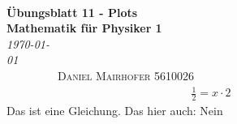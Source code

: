 \documentclass[10pt]{article}
\begin{document}
{\noindent\Huge\bf  \\[0.5\baselineskip] {\selectfont  Übungsblatt 11 - Plots}         }\\[2\baselineskip] %
{ {\bf {}\selectfont Mathematik für Physiker 1}\\ {\textit{\selectfont \today   }}}~~~~~~~~~~~~~~~~~~~~~~~~~~~~~~~~~~~~~~~~~~~~~~~~~~~~~~~~~~~~~~~~~~~~~~~~~~~~~\
{\textsc{Daniel Mairhofer 5610026}}%
\\[1.4\baselineskip] 
    
\begin{align}
                \frac 12 = x \cdot 2
\end{align}
Das ist eine Gleichung.
Das hier auch:
Nein
\end{document}
